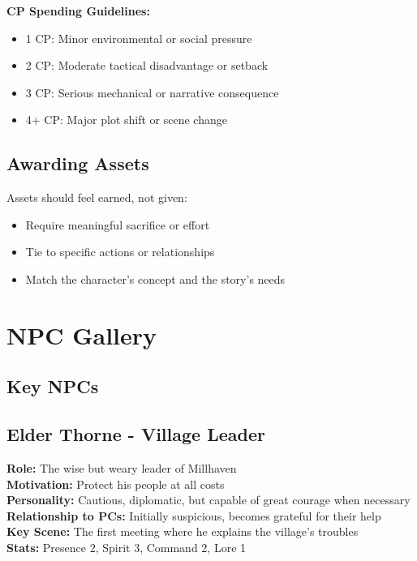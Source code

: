 \documentclass[11pt]{article}
\newenvironment{characterbox}[1]{%
  \begin{mdframed}[backgroundcolor=shadecolor, linewidth=1pt, linecolor=headercolor]%
  \subsection*{#1}%
}{%
  \end{mdframed}%
}
\begin{document}
\textbf{CP Spending Guidelines:}
\begin{itemize}
\item 1 CP: Minor environmental or social pressure
\item 2 CP: Moderate tactical disadvantage or setback
\item 3 CP: Serious mechanical or narrative consequence
\item 4+ CP: Major plot shift or scene change
\end{itemize}

\subsection{Awarding Assets}

Assets should feel earned, not given:
\begin{itemize}
\item Require meaningful sacrifice or effort
\item Tie to specific actions or relationships
\item Match the character's concept and the story's needs
\end{itemize}

\section{NPC Gallery}

\subsection{Key NPCs}

\begin{characterbox}{Elder Thorne - Village Leader}
\textbf{Role:} The wise but weary leader of Millhaven \\
\textbf{Motivation:} Protect his people at all costs \\
\textbf{Personality:} Cautious, diplomatic, but capable of great courage when necessary \\
\textbf{Relationship to PCs:} Initially suspicious, becomes grateful for their help \\
\textbf{Key Scene:} The first meeting where he explains the village's troubles \\
\textbf{Stats:} Presence 2, Spirit 3, Command 2, Lore 1
\end{characterbox}
\end{document}
